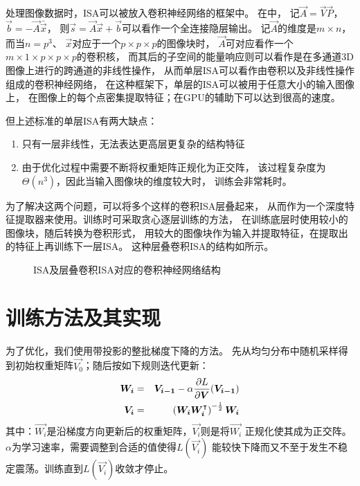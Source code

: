 处理图像数据时，ISA可以被放入卷积神经网络的框架中。
在中，
记$\vec{A} = \vec{V}\vec{P}$，$\vec{b}=-\vec{A}\bar{\vec{x}}$，
则$\vec{s}=\vec{A}\vec{x} + \vec{b}$可以看作一个全连接隐层输出。
记$\vec{A}$的维度是$m\times n$，而当$n=p^3$、
$\vec{x}$对应于一个$p\times p \times p$的图像块时，
$\vec{A}$可对应看作一个$m\times 1 \times p \times p \times p$的卷积核，
而其后的子空间的能量响应则可以看作是在多通道3D图像上进行的跨通道的非线性操作，
从而单层ISA可以看作由卷积以及非线性操作组成的卷积神经网络，
在这种框架下，单层的ISA可以被用于任意大小的输入图像上，
在图像上的每个点密集提取特征；在GPU的辅助下可以达到很高的速度。

但上述标准的单层ISA有两大缺点：
\begin{enumerate}
    \item 只有一层非线性，无法表达更高层更复杂的结构特征
    \item 由于优化过程中需要不断将权重矩阵正规化为正交阵，
        该过程复杂度为$\Theta(n^3)$，因此当输入图像块的维度较大时，
        训练会非常耗时。
\end{enumerate}

为了解决这两个问题，可以将多个这样的卷积ISA层叠起来，
从而作为一个深度特征提取器来使用。训练时可采取贪心逐层训练的方法，
在训练底层时使用较小的图像块，随后转换为卷积形式，
用较大的图像块作为输入并提取特征，在提取出的特征上再训练下一层ISA。
这种层叠卷积ISA的结构如所示。

\begin{figure}[H]
    \caption{ISA及层叠卷积ISA对应的卷积神经网络结构\cite{wu2013unsupervised}}
    \label{fig:isa:stack}
\end{figure}


\section{训练方法及其实现}
为了优化，我们使用带投影的整批梯度下降的方法。
先从均匀分布中随机采样得到初始权重矩阵$\vec{V_0}$；随后按如下规则迭代更新：
\begin{eqnarray}
    \boldsymbol{W_i} &=& \boldsymbol{V_{i-1}} - \alpha \frac{\partial L}{\partial
        \boldsymbol{V}}(\boldsymbol{V_{i-1}}) \nonumber  \\
        \boldsymbol{V_i} &=& \left(
            \boldsymbol{W_i}\boldsymbol{W_i}^\intercal\right)^{-\frac{1}{2}}\boldsymbol{W_i}
    \label{eqn:isa:train}
\end{eqnarray}
其中：$\vec{W_i}$是沿梯度方向更新后的权重矩阵，$\vec{V_i}$则是将$\vec{W_i}$
正规化使其成为正交阵。$\alpha$为学习速率，需要调整到合适的值使得$L(\vec{V_i})$
能较快下降而又不至于发生不稳定震荡。训练直到$L(\vec{V_i})$收敛才停止。

